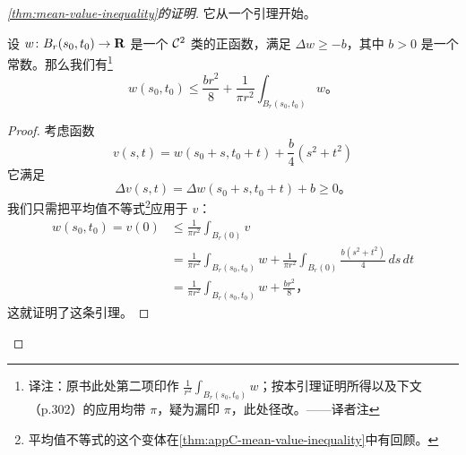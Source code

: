 \begin{proof}[\cref{thm:mean-value-inequality}的证明]
它从一个引理开始。

\begin{lemma}\label{thm:mean-inequality-ball}
设 $w\colon B_{r}(s_{0},t_{0})\to\mathbf{R}$ 是一个 $\mathcal{C}^{2}$ 类的正函数，满足 $\Delta w\ge-b$，其中 $b>0$ 是一个常数。那么我们有\footnote{译注：原书此处第二项印作 $\frac{1}{r^{2}}\int_{B_{r}(s_{0},t_{0})}w$；按本引理证明所得以及下文（p.302）的应用均带 $\pi$，疑为漏印 $\pi$，此处径改。——译者注}
\[
w(s_{0},t_{0})\le\frac{br^{2}}{8}+\frac{1}{\pi r^{2}}\int_{B_{r}(s_{0},t_{0})}w\text{。}
\]
\end{lemma}

\begin{proof}
考虑函数
\[
v(s,t)=w(s_{0}+s,t_{0}+t)+\frac{b}{4}(s^{2}+t^{2})
\]
它满足
\[
\Delta v(s,t)=\Delta w(s_{0}+s,t_{0}+t)+b\ge 0\text{。}
\]
我们只需把平均值不等式\footnote{平均值不等式的这个变体在\cref{thm:appC-mean-value-inequality}中有回顾。}应用于 $v$：
\[
\begin{aligned}
w(s_{0},t_{0})=v(0)&\le\frac{1}{\pi r^{2}}\int_{B_{r}(0)}v\\
&=\frac{1}{\pi r^{2}}\int_{B_{r}(s_{0},t_{0})}w+\frac{1}{\pi r^{2}}\int_{B_{r}(0)}\frac{b(s^{2}+t^{2})}{4}\,ds\,dt\\
&=\frac{1}{\pi r^{2}}\int_{B_{r}(s_{0},t_{0})}w+\frac{br^{2}}{8}\text{，}
\end{aligned}
\]
这就证明了这条引理。
\end{proof}


\end{proof}

